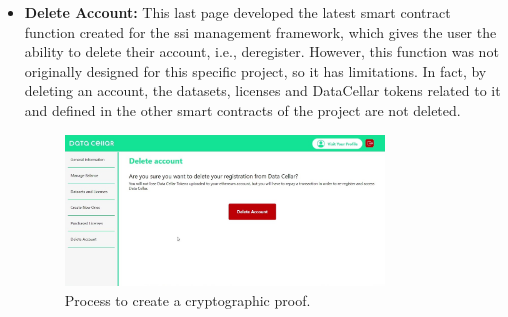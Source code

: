 \begin{itemize}
  \item \textbf{Delete Account:} This last page developed the latest smart contract function created for the \gls{ssi} management framework, which gives the user the ability to 
  delete their account, i.e., deregister. However, this function was not originally designed for this specific project, so it has limitations. In fact, by deleting an 
  account, the datasets, licenses and DataCellar tokens related to it and defined in the other smart contracts of the project are not deleted.

  \begin{figure}[h]  
    \centering
    \includegraphics[width=0.8\textwidth]{Images/c6_11.jpg} 
    \caption{Process to create a cryptographic proof.}
  \end{figure}

\end{itemize}